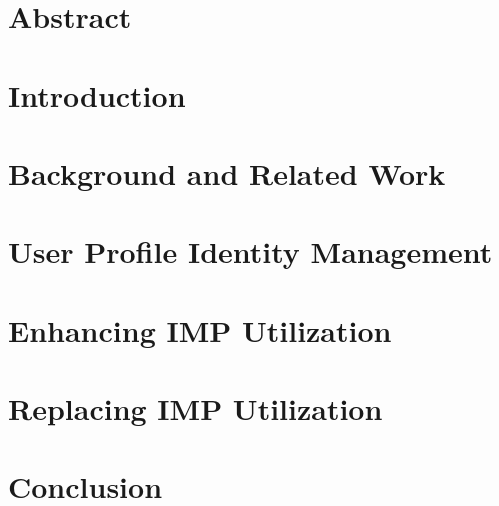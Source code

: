 \documentclass[
     12pt,         %
     a4paper,      %
     BCOR=10mm,version=first,     %
     DIV=14,version=first,        %
     ]{scrreprt}
\begin{document}
\newpage

\chapter*{Abstract}

\newpage

\tableofcontents
\cleardoublepage
{}

\chapter{Introduction}


\chapter{Background and Related Work}


\chapter{User Profile Identity Management} \label{chapter:user_profile_identity_management}


\chapter{Enhancing IMP Utilization}


\chapter{Replacing IMP Utilization}


\chapter{Conclusion}


\printbibliography
\end{document}
